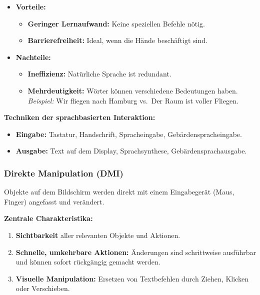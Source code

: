 \documentclass[12pt, a4paper]{article}
\begin{document}
\begin{itemize}
  \item \textbf{Vorteile:}
    \begin{itemize}
      \item \textbf{Geringer Lernaufwand:} Keine speziellen Befehle nötig.
      \item \textbf{Barrierefreiheit:} Ideal, wenn die Hände beschäftigt sind.
    \end{itemize}
  \item \textbf{Nachteile:}
    \begin{itemize}
      \item \textbf{Ineffizienz:} Natürliche Sprache ist redundant.
      \item \textbf{Mehrdeutigkeit:} Wörter können verschiedene Bedeutungen haben.\\
            \textit{Beispiel:} \glqq{}Wir fliegen nach Hamburg\grqq{} vs.\
            \glqq{}Der Raum ist voller Fliegen\grqq{}.
    \end{itemize}
\end{itemize}

\textbf{Techniken der sprachbasierten Interaktion:}
\begin{itemize}
  \item \textbf{Eingabe:} Tastatur, Handschrift, Spracheingabe, Gebärdenspracheingabe.
  \item \textbf{Ausgabe:} Text auf dem Display, Sprachsynthese, Gebärdensprachausgabe.
\end{itemize}

\subsubsection{Direkte Manipulation (DMI)}

Objekte auf dem Bildschirm werden direkt mit einem Eingabegerät (Maus, Finger)
angefasst und verändert.

\textbf{Zentrale Charakteristika:}
\begin{enumerate}
  \item \textbf{Sichtbarkeit} aller relevanten Objekte und Aktionen.
  \item \textbf{Schnelle, umkehrbare Aktionen:} Änderungen sind schrittweise
        ausführbar und können sofort rückgängig gemacht werden.
  \item \textbf{Visuelle Manipulation:} Ersetzen von Textbefehlen durch Ziehen,
        Klicken oder Verschieben.
\end{enumerate}
\end{document}

